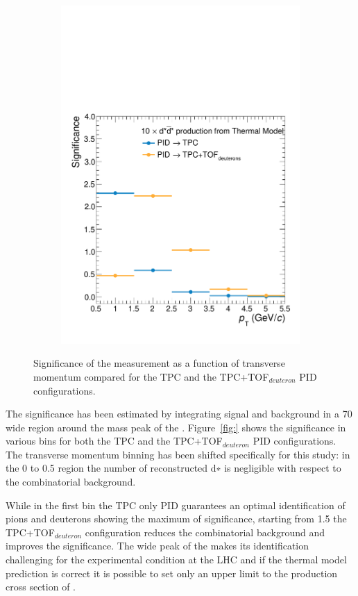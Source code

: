 \begin{figure}
\begin{subfigure}{.33\textwidth}
  \includegraphics[width=\linewidth]{gfx/sig_2}
  \caption{}
  \label{fig:tem23}
\end{subfigure}
\caption{Significance of the measurement as a function of transverse momentum compared for the TPC and the TPC+TOF$_{deuteron}$ PID configurations.} %
\label{fig:tem01}
\end{figure}

The significance has been estimated by integrating signal and background in a 70 \mevcs wide region around the
mass peak of the \ds. Figure~\ref{fig:} shows the significance in various \pt bins for both the TPC and the
TPC+TOF$_{deuteron}$ PID configurations.
The transverse momentum binning has been shifted specifically for this study: in the 0 to 0.5 \pT region the number of reconstructed d∗ is negligible with respect to the combinatorial background.

While in the first \pT bin the TPC only PID guarantees an optimal identification of pions and deuterons showing the 
maximum of significance, starting from 1.5 \gev the TPC+TOF$_{deuteron}$ configuration reduces the combinatorial background
and improves the significance. 
The wide peak of the \ds makes its identification challenging for the experimental condition at the LHC and if the thermal
model prediction is correct it is possible to set only an upper limit to the production cross section of \ds.


